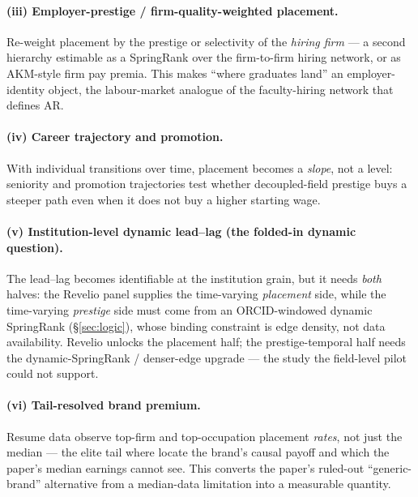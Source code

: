 \documentclass[11pt]{article}
\begin{document}
\paragraph{(iii) Employer-prestige / firm-quality-weighted placement.} Re-weight placement by the prestige or
selectivity of the \emph{hiring firm} --- a second hierarchy estimable as a SpringRank over the firm-to-firm
hiring network, or as AKM-style firm pay premia. This makes ``where graduates land'' an employer-identity object,
the labour-market analogue of the faculty-hiring network that defines AR.

\paragraph{(iv) Career trajectory and promotion.} With individual transitions over time, placement becomes a
\emph{slope}, not a level: seniority and promotion trajectories test whether decoupled-field prestige buys a
steeper path even when it does not buy a higher starting wage.

\paragraph{(v) Institution-level dynamic lead--lag (the folded-in dynamic question).} The lead--lag becomes
identifiable at the institution grain, but it needs \emph{both} halves: the Revelio panel supplies the time-varying
\emph{placement} side, while the time-varying \emph{prestige} side must come from an ORCID-windowed dynamic
SpringRank (\S\ref{sec:logic}), whose binding constraint is edge density, not data availability. Revelio unlocks the
placement half; the prestige-temporal half needs the dynamic-SpringRank / denser-edge upgrade --- the study the
field-level pilot could not support.

\paragraph{(vi) Tail-resolved brand premium.} Resume data observe top-firm and top-occupation placement
\emph{rates}, not just the median --- the elite tail where \citet{chetty2023diversifying} locate the brand's
causal payoff and which the paper's median earnings cannot see. This converts the paper's ruled-out
``generic-brand'' alternative from a median-data limitation into a measurable quantity.
\end{document}
